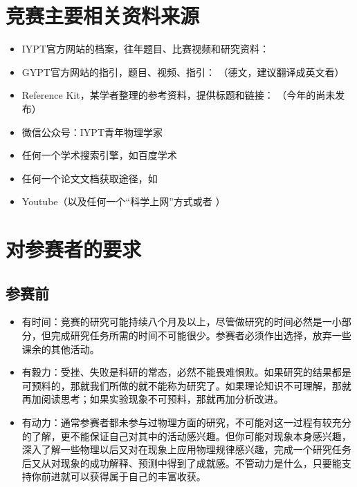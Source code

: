 \documentclass[a4paper,10pt,english]{sphinxmanual}
\begin{document}
\section{竞赛主要相关资料来源}
\label{\detokenize{2. Intro_Tournament:id5}}\begin{itemize}
\item {} 
IYPT官方网站的档案，往年题目、比赛视频和研究资料：

\item {} 
GYPT官方网站的指引，题目、视频、指引： （德文，建议翻译成英文看）

\item {} 
Reference Kit，某学者整理的参考资料，提供标题和链接：  （今年的尚未发布）

\item {} 
微信公众号：IYPT青年物理学家

\item {} 
任何一个学术搜索引擎，如百度学术

\item {} 
任何一个论文文档获取途径，如 

\item {} 
Youtube（以及任何一个“科学上网”方式或者  ）

\end{itemize}


\section{对参赛者的要求}
\label{\detokenize{2. Intro_Tournament:id6}}\label{\detokenize{2. Intro_Tournament:onlinevideoconverter}}

\subsection{参赛前}
\label{\detokenize{2. Intro_Tournament:id7}}\begin{itemize}
\item {} 
有时间：竞赛的研究可能持续八个月及以上，尽管做研究的时间必然是一小部分，但完成研究任务所需的时间不可能很少。参赛者必须作出选择，放弃一些课余的其他活动。

\item {} 
有毅力：受挫、失败是科研的常态，必然不能畏难惧败。如果研究的结果都是可预料的，那就我们所做的就不能称为研究了。如果理论知识不可理解，那就再加阅读思考；如果实验现象不可预料，那就再加分析改进。

\item {} 
有动力：通常参赛者都未参与过物理方面的研究，不可能对这一过程有较充分的了解，更不能保证自己对其中的活动感兴趣。但你可能对现象本身感兴趣，深入了解一些物理以后又对在现象上应用物理规律感兴趣，完成一个研究任务后又从对现象的成功解释、预测中得到了成就感。不管动力是什么，只要能支持你前进就可以获得属于自己的丰富收获。

\end{itemize}
\end{document}
